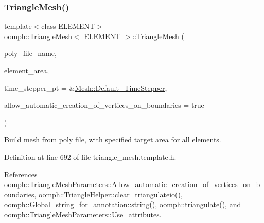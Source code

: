 \mbox{\label{classoomph_1_1TriangleMesh_aa0346dc3c88395c949f2e2c0209aea39}} 
\subsubsection{\texorpdfstring{Triangle\+Mesh()}{TriangleMesh()}\hspace{0.1cm}{\footnotesize\ttfamily [4/5]}}
{\footnotesize\ttfamily template$<$class E\+L\+E\+M\+E\+NT$>$ \\
\hyperlink{classoomph_1_1TriangleMesh}{oomph\+::\+Triangle\+Mesh}$<$ E\+L\+E\+M\+E\+NT $>$\+::\hyperlink{classoomph_1_1TriangleMesh}{Triangle\+Mesh} (\begin{DoxyParamCaption}\item[{const std\+::string \&}]{poly\+\_\+file\+\_\+name,  }\item[{const double \&}]{element\+\_\+area,  }\item[{\hyperlink{classoomph_1_1TimeStepper}{Time\+Stepper} $\ast$}]{time\+\_\+stepper\+\_\+pt = {\ttfamily \&\hyperlink{classoomph_1_1Mesh_a12243d0fee2b1fcee729ee5a4777ea10}{Mesh\+::\+Default\+\_\+\+Time\+Stepper}},  }\item[{const bool \&}]{allow\+\_\+automatic\+\_\+creation\+\_\+of\+\_\+vertices\+\_\+on\+\_\+boundaries = {\ttfamily true} }\end{DoxyParamCaption})\hspace{0.3cm}{\ttfamily [inline]}}



Build mesh from poly file, with specified target area for all elements. 



Definition at line 692 of file triangle\+\_\+mesh.\+template.\+h.



References oomph\+::\+Triangle\+Mesh\+Parameters\+::\+Allow\+\_\+automatic\+\_\+creation\+\_\+of\+\_\+vertices\+\_\+on\+\_\+boundaries, oomph\+::\+Triangle\+Helper\+::clear\+\_\+triangulateio(), oomph\+::\+Global\+\_\+string\+\_\+for\+\_\+annotation\+::string(), oomph\+::triangulate(), and oomph\+::\+Triangle\+Mesh\+Parameters\+::\+Use\+\_\+attributes.

\mbox{\label{classoomph_1_1TriangleMesh_a2a6d680ea50dca34788f4f0c480d9d75}} 
